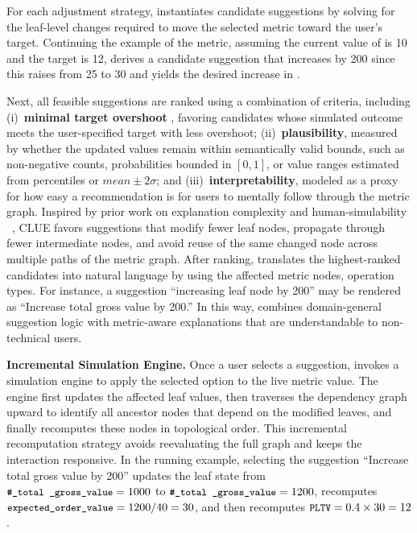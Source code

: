 For each adjustment strategy, \clue instantiates candidate suggestions by
solving for the leaf-level changes required to move the selected metric toward
the user's target. Continuing the example of the  metric, assuming
the current value of  is 10 and the target is 12, \clue derives a
candidate suggestion that increases  by 200
since this raises  from 25 to 30 and yields the
desired increase in .

Next, all feasible suggestions are ranked using a combination of criteria,
including (i)~\textbf{minimal target overshoot}
, favoring candidates whose simulated outcome meets the user-specified target
with less overshoot; (ii)~\textbf{plausibility}, measured by whether the updated
values remain within semantically valid bounds, such as non-negative counts,
probabilities bounded in $[0, 1]$, or value ranges estimated from percentiles or
$mean \pm 2\sigma$; and (iii)~\textbf{interpretability}, modeled as a proxy for
how easy a recommendation is for users to mentally follow through the metric
graph. Inspired by prior work on explanation complexity and human-simulability
~\cite{lage2019human}, CLUE favors suggestions that modify fewer leaf nodes,
propagate through fewer intermediate nodes, and avoid reuse of the same changed
node across multiple paths of the metric graph. 
After ranking, \clue translates the highest-ranked candidates into natural
language by using the affected metric nodes, operation types. For instance, a
suggestion ``increasing leaf node by 200'' may be rendered as ``Increase total
gross value by 200.'' In this way, \clue combines domain-general suggestion
logic with metric-aware explanations that are understandable to non-technical
users.



\noindent \textbf{Incremental Simulation Engine.} Once a user selects a
suggestion, \clue invokes a simulation engine to apply the selected option to
the live metric value. The engine first updates the affected leaf values, then
traverses the dependency graph upward to identify all ancestor nodes that depend
on the modified leaves, and finally recomputes these nodes in topological order.
This incremental recomputation strategy avoids reevaluating the full graph and
keeps the interaction responsive. In the running example, selecting the
suggestion ``Increase total gross value by 200'' updates the leaf state from
${\small\texttt{{\small\#\_total \_gross\_value}}}=1000$ to ${\small\texttt{{\small\#\_total
\_gross\_value}}}=1200$, recomputes ${\small\texttt{{\small expected\_order\_value}}}=1200/40=30$,
and then recomputes ${\small\texttt{{\small PLTV}}}=0.4\times30=12$.